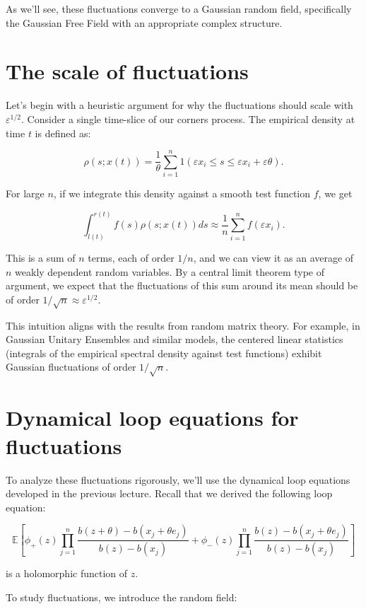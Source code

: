 \documentclass[letterpaper,11pt,oneside,reqno]{article}
\numberwithin{equation}{section}
\theoremstyle{definition}
\begin{document}
As we'll see, these fluctuations converge to a Gaussian random field, specifically the Gaussian Free Field with an appropriate complex structure.

\section{The scale of fluctuations}

Let's begin with a heuristic argument for why the fluctuations should scale with $\varepsilon^{1/2}$. Consider a single time-slice of our corners process. The empirical density at time $t$ is defined as:

$$\rho(s; x(t)) = \frac{1}{\theta}\sum_{i=1}^n 1(\varepsilon x_i \leq s \leq \varepsilon x_i + \varepsilon\theta).$$

For large $n$, if we integrate this density against a smooth test function $f$, we get

$$\int_{l(t)}^{r(t)} f(s)\rho(s; x(t))ds \approx \frac{1}{n}\sum_{i=1}^n f(\varepsilon x_i).$$

This is a sum of $n$ terms, each of order $1/n$, and we can view it as an average of $n$ weakly dependent random variables. By a central limit theorem type of argument, we expect that the fluctuations of this sum around its mean should be of order $1/\sqrt{n} \approx \varepsilon^{1/2}$.

This intuition aligns with the results from random matrix theory. For example, in Gaussian Unitary Ensembles and similar models, the centered linear statistics (integrals of the empirical spectral density against test functions) exhibit Gaussian fluctuations of order $1/\sqrt{n}$.

\section{Dynamical loop equations for fluctuations}

To analyze these fluctuations rigorously, we'll use the dynamical loop equations developed in the previous lecture. Recall that we derived the following loop equation:

$$\mathbb{E}\left[\phi_+(z) \prod_{j=1}^n \frac{b(z + \theta) - b(x_j + \theta e_j)}{b(z) - b(x_j)} + \phi_-(z) \prod_{j=1}^n \frac{b(z) - b(x_j + \theta e_j)}{b(z) - b(x_j)}\right]$$

is a holomorphic function of $z$.

To study fluctuations, we introduce the random field:
\end{document}

